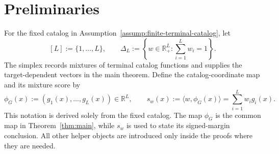 \section{Preliminaries}\label{sec:preliminaries}

For the fixed catalog in Assumption~\ref{assump:finite-terminal-catalog}, let
\[
[L]:=\{1,\ldots,L\},\qquad
\Delta_L:=\left\{w\in\mathbb R_+^L:\sum_{i=1}^Lw_i=1\right\}.
\]
The simplex records mixtures of terminal catalog functions and supplies the
target-dependent vectors in the main theorem.  Define the catalog-coordinate
map and its mixture score by
\[
\phi_G(x):=(g_1(x),\ldots,g_L(x))\in\mathbb R^L,
\qquad
s_w(x):=\langle w,\phi_G(x)\rangle
=\sum_{i=1}^Lw_i g_i(x).
\]
This notation is derived solely from the fixed catalog.  The map $\phi_G$ is
the common map in Theorem~\ref{thm:main}, while $s_w$ is used to state its signed-margin
conclusion.  All other helper objects are introduced only inside the proofs
where they are needed.
